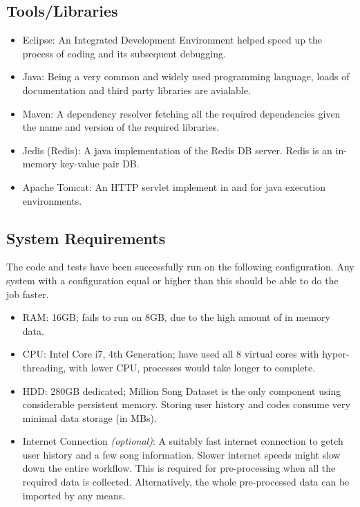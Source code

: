 		\subsection{Tools/Libraries}
\begin{itemize}
	\item Eclipse: An Integrated Development Environment helped speed up the process of coding and its subsequent debugging.
	\item Java: Being a very common and widely used programming language, loads of  documentation and third party libraries are avialable.
	\item Maven: A dependency resolver fetching all the required dependencies given the name and version of the required libraries.
	\item Jedis (Redis): A java implementation of the Redis DB server. Redis is an in-memory key-value pair DB.
	\item Apache Tomcat: An HTTP servlet implement in and for java execution environments.
\end{itemize}

		\subsection{System Requirements}
		The code and tests have been successfully run on the following configuration. Any system with a configuration equal or higher than this should be able to do the job faster.
\begin{itemize}
	\item RAM: 16GB; fails to run on 8GB, due to the high amount of in memory data.
	\item CPU: Intel Core i7, 4th Generation; have used all 8 virtual cores with hyper-threading, with lower CPU, processes would take longer to complete.
	\item HDD: 280GB dedicated; Million Song Dataset is the only component using considerable persistent memory. Storing user history and codes consume very minimal data storage (in MBs).
	\item Internet Connection \emph{(optional)}: A suitably fast internet connection to getch user history and a few song information. Slower internet speeds might slow down the entire workflow. This is required for pre-processing when all the required data is collected. Alternatively, the whole pre-processed data can be imported by any means.
\end{itemize}
		
